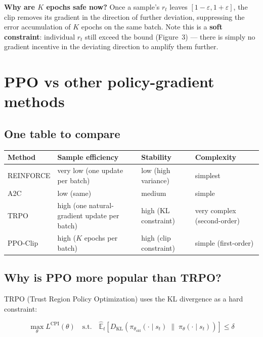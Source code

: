 \documentclass{article}
\begin{document}
\textbf{Why are $K$ epochs safe now?} Once a sample's $r_t$ leaves $[1-\varepsilon, 1+\varepsilon]$, the clip removes its gradient in the direction of further deviation, suppressing the error accumulation of $K$ epochs on the same batch. Note this is a \textbf{soft constraint}: individual $r_t$ still exceed the bound (Figure~3) --- there is simply no gradient incentive in the deviating direction to amplify them further.

\section*{PPO vs other policy-gradient methods}

\subsection*{One table to compare}

\begin{center}
\small
\setlength{\tabcolsep}{3pt}
\begin{tabular}{>{\raggedright\arraybackslash}p{}|>{\raggedright\arraybackslash}p{}|>{\raggedright\arraybackslash}p{}|>{\raggedright\arraybackslash}p{}}
\textbf{Method} & \textbf{Sample efficiency} & \textbf{Stability} & \textbf{Complexity} \\
\hline
REINFORCE  & very low (one update per batch) & low (high variance) & simplest \\
A2C        & low (same) & medium & simple \\
TRPO       & high (one natural-gradient update per batch) & high (KL constraint) & very complex (second-order) \\
PPO-Clip   & high ($K$ epochs per batch) & high (clip constraint) & simple (first-order) \\
\end{tabular}
\end{center}

\subsection*{Why is PPO more popular than TRPO?}

TRPO (Trust Region Policy Optimization) uses the KL divergence as a hard constraint:

\[
\max_\theta L^{\text{CPI}}(\theta)
\quad \text{s.t.} \quad
\hat{\mathbb{E}}_t\!\left[D_{\text{KL}}\!\left(\pi_{\theta_\text{old}}(\cdot\mid s_t)
  \;\|\; \pi_\theta(\cdot\mid s_t)\right)\right] \le \delta
\]
\end{document}
